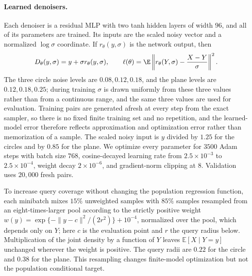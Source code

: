 \paragraph{Learned denoisers.}
Each denoiser is a residual MLP with two tanh hidden layers of
width $96$, and all of its parameters are trained.  Its inputs are the scaled
noisy vector and a normalized
$\log\sigma$ coordinate.  If $r_\theta(y,\sigma)$ is the network output, then
\[
  D_\theta(y,\sigma)=y+\sigma r_\theta(y,\sigma),
  \qquad
  \ell(\theta)=
  \E\left\|r_\theta(Y,\sigma)-\frac{X-Y}{\sigma}\right\|^2.
\]
The three circle noise levels are $0.08,0.12,0.18$, and the plane levels are
$0.12,0.18,0.25$; during training $\sigma$ is drawn uniformly from these three
values rather than from a continuous range, and the same three values are used
for evaluation.  Training pairs are generated afresh at every step from the
exact sampler, so there is no fixed finite training set and no repetition, and
the learned-model error therefore reflects approximation and optimization error
rather than memorization of a sample.  The scaled noisy input is $y$ divided by
$1.25$ for the circles and by $0.85$ for the plane.  We optimize every parameter for $3500$ Adam steps with batch
size $768$, cosine-decayed learning rate from $2.5\times10^{-3}$ to
$2.5\times10^{-4}$, weight decay $2\times10^{-6}$, and gradient-norm clipping
at $8$.  Validation uses $20{,}000$ fresh pairs.

To increase query coverage without changing the population regression
function, each minibatch mixes $15\%$ unweighted samples with $85\%$ samples
resampled from an eight-times-larger pool according to the strictly positive
weight $w(y)=\exp\{-\|y-c\|^2/(2r^2)\}+10^{-4}$, normalized over the pool, which
depends only on $Y$; here $c$ is the evaluation point and $r$ the query radius
below.  Multiplication of the joint density by a
function of $Y$ leaves $\mathbb E[X\mid Y=y]$ unchanged wherever the weight is
positive.  The query radii are $0.22$ for the circle and $0.38$ for the plane.
This resampling changes finite-model optimization but not the population
conditional target.


